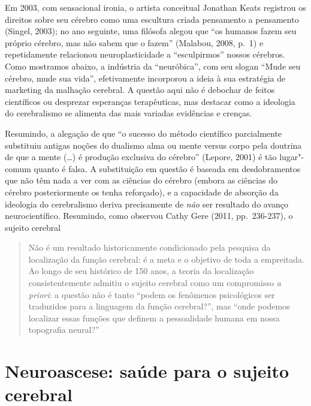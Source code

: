 Em 2003, com sensacional ironia, o artista conceitual Jonathan Keats
registrou os direitos sobre seu cérebro como uma escultura criada
pensamento a pensamento (Singel, 2003); no ano seguinte, uma filósofa
alegou que ``os humanos fazem seu próprio cérebro, mas não
sabem que o fazem'' (Malabou, 2008, p.~1) e repetidamente relacionou
neuroplasticidade a ``esculpirmos'' nossos cérebros. Como mostramos
abaixo, a indústria da ``neuróbica'', com seu slogan ``Mude seu cérebro,
mude sua vida'', efetivamente incorporou a ideia à sua estratégia de
marketing da malhação cerebral. A questão aqui não é debochar de feitos
científicos ou desprezar esperanças terapêuticas, mas destacar como a
ideologia do cerebralismo se alimenta das mais variadas evidências e
crenças.

Resumindo, a alegação de que ``o sucesso do método científico
parcialmente substituiu antigas noções do dualismo alma ou mente versus
corpo pela doutrina de que a mente (\ldots{}) é produção exclusiva do
cérebro'' (Lepore, 2001) é tão lugar"-comum quanto é falsa. A
substituição em questão é baseada em desdobramentos que não têm nada a
ver com as ciências do cérebro (embora as ciências do cérebro
posteriormente os tenha reforçado), e a capacidade de absorção da
ideologia do cerebralismo deriva precisamente de \emph{não} ser
resultado do avanço neurocientífico. Resumindo, como observou Cathy Gere
(2011, pp.~236-237), o sujeito cerebral

\begin{quote}
Não é um resultado historicamente condicionado pela pesquisa da
localização da função cerebral: é a meta e o objetivo de toda a
empreitada. Ao longo de seu histórico de 150 anos, a
teoria da localização consistentemente admitiu o sujeito cerebral como
um compromisso \emph{a priori}: a questão não é tanto ``podem os fenômenos
psicológicos ser traduzidos para a linguagem da função
cerebral?'', mas ``onde podemos localizar essas funções que definem a
pessoalidade humana em nossa topografia neural?''
\end{quote}

\section{Neuroascese: saúde para o sujeito cerebral}

